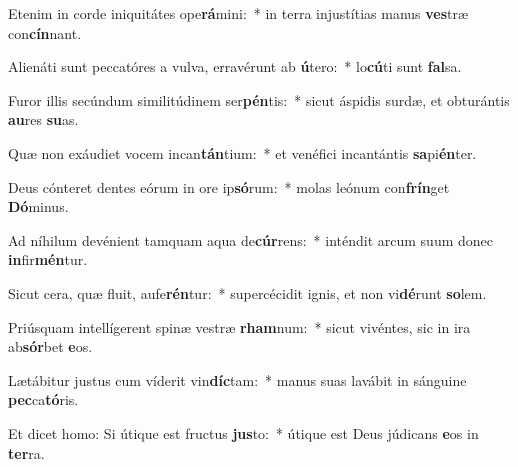 \item Etenim in corde iniquitátes ope\textbf{rá}mini:~* in terra injustítias manus \textbf{ves}træ con\textbf{cín}nant.
\item Alienáti sunt peccatóres a vulva, erravérunt ab \textbf{ú}tero:~* lo\textbf{cú}ti sunt \textbf{fal}sa.
\item Furor illis secúndum similitúdinem ser\textbf{pén}tis:~* sicut áspidis surdæ, et obturántis \textbf{au}res \textbf{su}as.
\item Quæ non exáudiet vocem incan\textbf{tán}tium:~* et venéfici incantántis \textbf{sa}pi\textbf{én}ter.
\item Deus cónteret dentes eórum in ore ip\textbf{só}rum:~* molas leónum con\textbf{frín}get \textbf{Dó}minus.
\item Ad níhilum devénient tamquam aqua de\textbf{cúr}rens:~* inténdit arcum suum donec \textbf{in}fir\textbf{mén}tur.
\item Sicut cera, quæ fluit, aufe\textbf{rén}tur:~* supercécidit ignis, et non vi\textbf{dé}runt \textbf{so}lem.
\item Priúsquam intellígerent spinæ vestræ \textbf{rham}num:~* sicut vivéntes, sic in ira ab\textbf{sór}bet \textbf{e}os.
\item Lætábitur justus cum víderit vin\textbf{díc}tam:~* manus suas lavábit in sánguine \textbf{pec}ca\textbf{tó}ris.
\item Et dicet homo: Si útique est fructus \textbf{jus}to:~* útique est Deus júdicans \textbf{e}os in \textbf{ter}ra.
